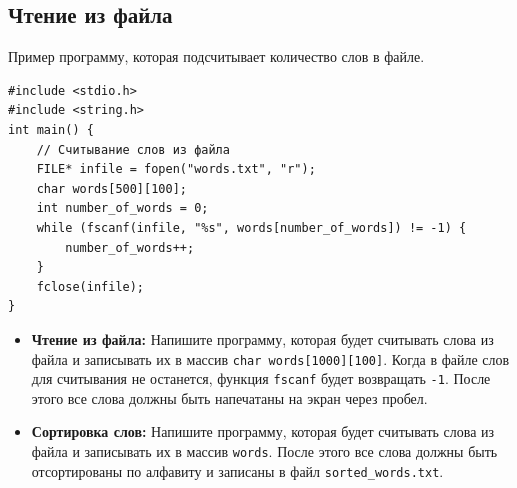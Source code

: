 \documentclass{article}
\begin{document}
\subsection*{Чтение из файла}
Пример программу, которая подсчитывает количество слов в файле.
\begin{lstlisting}
#include <stdio.h>
#include <string.h>
int main() {
	// Считывание слов из файла
	FILE* infile = fopen("words.txt", "r");
	char words[500][100];
	int number_of_words = 0;
	while (fscanf(infile, "%s", words[number_of_words]) != -1) {
		number_of_words++;
	}
	fclose(infile);
}
\end{lstlisting}
\begin{itemize}
\item \textbf{Чтение из файла:} Напишите программу, которая будет считывать слова из файла и записывать их в массив \texttt{char words[1000][100]}. Когда в файле слов для считывания не останется, функция \texttt{fscanf} будет возвращать \texttt{-1}. После этого все слова должны быть напечатаны на экран через пробел. 
\item \textbf{Сортировка слов:} Напишите программу, которая будет считывать слова из файла и записывать их в массив \texttt{words}. После этого все слова должны быть отсортированы по алфавиту и записаны в файл \texttt{sorted\_words.txt}.
\end{itemize}
\end{document}
